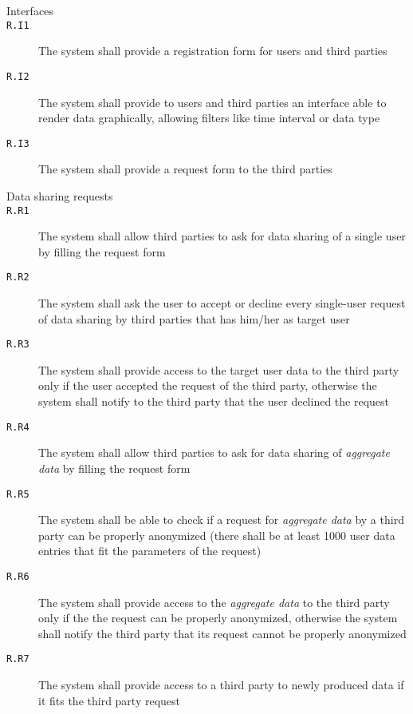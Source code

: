 \begin{description}
      \item[Interfaces]
      \item[\texttt{R.I1}] The system shall provide a registration form for users and third parties
      \item[\texttt{R.I2}] The system shall provide to users and third parties an interface able to render data graphically, allowing filters like time interval or data type
      \item[\texttt{R.I3}] The system shall provide a request form to the third parties

      \item[Data sharing requests]
      \item[\texttt{R.R1}] The system shall allow third parties to ask for data sharing of a single user by filling the request form
      \item[\texttt{R.R2}] The system shall ask the user to accept or decline every single-user request of data sharing by third parties that has him/her as target user
      \item[\texttt{R.R3}] The system shall provide access to the target user data to the third party only if the user accepted the request of the third party, otherwise the system shall notify to the third party that the user declined the request
      \item[\texttt{R.R4}] The system shall allow third parties to ask for data sharing of \textit{aggregate data} by filling the request form
      \item[\texttt{R.R5}] The system shall be able to check if a request for \textit{aggregate data} by a third party can be properly anonymized (there shall be at least 1000 user data entries that fit the parameters of the request)
      \item[\texttt{R.R6}] The system shall provide access to the \textit{aggregate data} to the third party only if the the request can be properly anonymized, otherwise the system shall notify the third party that its request cannot be properly anonymized
      \item[\texttt{R.R7}] The system shall provide access to a third party to newly produced data if it fits the third party request


\end{description}
